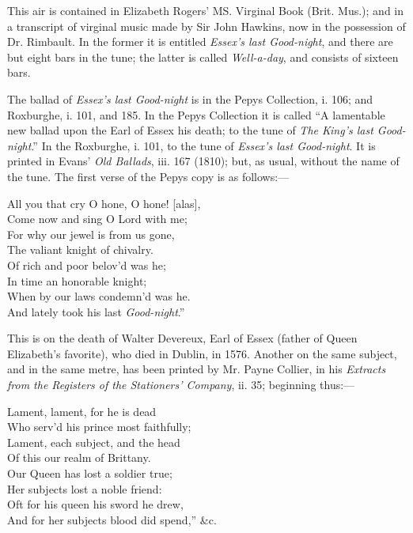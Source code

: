 This air is contained in Elizabeth Rogers’ MS. Virginal Book (Brit. Mus.);
and in a transcript of virginal music made by Sir John Hawkins, now in the possession
of Dr. Rimbault. In the former it is entitled \textit{Essex’s last Good-night}, and
there are but eight bars in the tune; the latter is called \textit{Well-a-day}, and consists
of sixteen bars.

The ballad of \textit{Essex's last Good-night} is in the Pepys Collection, i. 106; and
Roxburghe, i. 101, and 185. In the Pepys Collection it is called “A lamentable
new ballad upon the Earl of Essex his death; to the tune of \textit{The King's last
Good-night}.” In the Roxburghe, i. 101, to the tune of \textit{Essex's last Good-night}.
It is printed in Evans’ \textit{Old Ballads}, iii. 167 (1810); but, as usual, without the
name of the tune. The first verse of the Pepys copy is as follows:—
\settowidth{\versewidth}{All you that cry O hone, O hone! [alas],}
\begin{scverse}
\begin{altverse}
All you that cry O hone, O hone! [alas],\\
Come now and sing O Lord with me;\\
For why our jewel is from us gone,\\
The valiant knight of chivalry.\\
Of rich and poor belov’d was he;\\
In time an honorable knight;\\
When by our laws condemn’d was he.\\
And lately took his last \textit{Good-night}.”
\end{altverse}
\end{scverse}

This is on the death of Walter Devereux, Earl of Essex (father of Queen Elizabeth’s
favorite), who died in Dublin, in 1576. Another on the same subject, and
in the same metre, has been printed by Mr. Payne Collier, in his \textit{Extracts from
the Registers of the Stationers' Company}, ii. 35; beginning thus:—
\pagebreak

\settowidth{\versewidth}{Lament, each subject, and the head}
\begin{scverse}
\begin{altverse}
Lament, lament, for he is dead\\
Who serv’d his prince most faithfully;\\
Lament, each subject, and the head\\
Of this our realm of Brittany.\\
Our Queen has lost a soldier true;\\
Her subjects lost a noble friend:\\
Oft for his queen his sword he drew,\\
And for her subjects blood did spend,” \&c.
\end{altverse}
\end{scverse}

